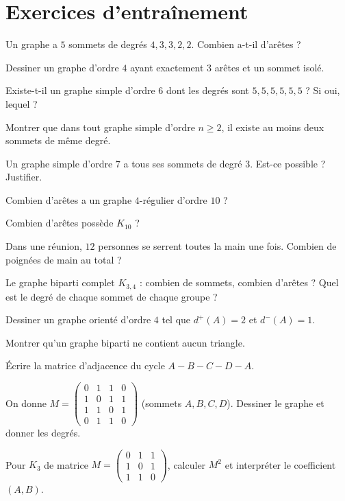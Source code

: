 \section{Exercices d'entraînement}

\exo{} Un graphe a $5$ sommets de degrés $4,3,3,2,2$. Combien a-t-il d'arêtes ?

\exo{} Dessiner un graphe d'ordre $4$ ayant exactement $3$ arêtes et un sommet isolé.

\exo{} Existe-t-il un graphe simple d'ordre $6$ dont les degrés sont $5,5,5,5,5,5$ ?
Si oui, lequel ?

\exo{} Montrer que dans tout graphe simple d'ordre $n\ge2$, il existe au moins deux
sommets de même degré.

\exo{} Un graphe simple d'ordre $7$ a tous ses sommets de degré $3$. Est-ce possible ?
Justifier.

\exo{} Combien d'arêtes a un graphe $4$-régulier d'ordre $10$ ?

\exo{} Combien d'arêtes possède $K_{10}$ ?

\exo{} Dans une réunion, $12$ personnes se serrent toutes la main une fois. Combien
de poignées de main au total ?

\exo{} Le graphe biparti complet $K_{3,4}$ : combien de sommets, combien d'arêtes ?
Quel est le degré de chaque sommet de chaque groupe ?

\exo{} Dessiner un graphe orienté d'ordre $4$ tel que $d^{+}(A)=2$ et $d^{-}(A)=1$.

\exo{} Montrer qu'un graphe biparti ne contient aucun triangle.

\exo{} Écrire la matrice d'adjacence du cycle $A\!-\!B\!-\!C\!-\!D\!-\!A$.

\exo{} On donne $M=\begin{pmatrix}0&1&1&0\\1&0&1&1\\1&1&0&1\\0&1&1&0\end{pmatrix}$
(sommets $A,B,C,D$). Dessiner le graphe et donner les degrés.

\exo{} Pour $K_3$ de matrice $M=\begin{pmatrix}0&1&1\\1&0&1\\1&1&0\end{pmatrix}$,
calculer $M^2$ et interpréter le coefficient $(A,B)$.

